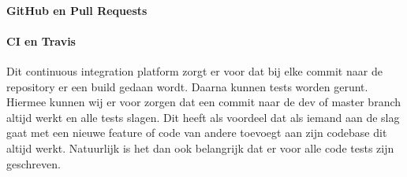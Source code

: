 \paragraph{GitHub en Pull Requests}
\paragraph{CI en Travis}
Dit continuous integration platform zorgt er voor dat bij elke commit naar de repository er een build gedaan wordt. Daarna kunnen tests worden gerunt. Hiermee kunnen wij er voor zorgen dat een commit naar de dev of master branch altijd werkt en alle tests slagen. Dit heeft als voordeel dat als iemand aan de slag gaat met een nieuwe feature of code van andere toevoegt aan zijn codebase dit altijd werkt. Natuurlijk is het dan ook belangrijk dat er voor alle code tests zijn geschreven.

